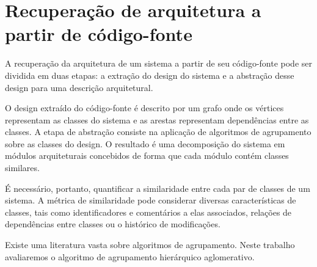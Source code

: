 
\section{Recuperação de arquitetura a partir de código-fonte} \label{sec:recovery}

A recuperação da arquitetura de um sistema a partir de seu código-fonte pode
ser dividida em duas etapas: a extração do design do sistema e a abstração
desse design para uma descrição arquitetural.


O design extraído do código-fonte é
descrito por um grafo onde os vértices representam as classes do sistema
e as arestas representam dependências entre as classes. 
A etapa de abstração consiste na aplicação de algoritmos de agrupamento sobre
as classes do design. O resultado é uma decomposição do sistema em módulos
arquiteturais concebidos de forma que cada módulo contém classes similares.


É necessário, portanto, quantificar a similaridade entre cada par de classes
de um sistema. A métrica de similaridade pode considerar diversas 
características de classes, tais como identificadores e comentários a elas
associados, relações de dependências entre classes ou o histórico de 
modificações.

Existe uma literatura vasta sobre algoritmos de agrupamento. Neste trabalho
avaliaremos o algoritmo de agrupamento hierárquico aglomerativo.


